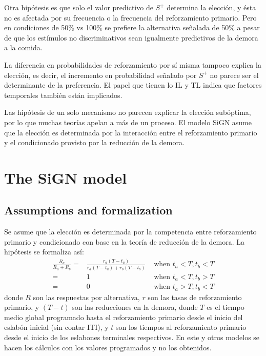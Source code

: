\documentclass[a4paper,12pt]{article}
\begin{document}
Otra hipótesis es que solo el valor predictivo de $S^{+}$ determina la elección, y ésta no es afectada por su frecuencia o la frecuencia del reforzamiento primario.
Pero en condiciones de 50\% vs 100\% se prefiere la alternativa señalada de 50\% a pesar de que los estímulos no discriminativos sean igualmente predictivos de la demora a la comida.

La diferencia en probabilidades de reforzamiento por sí misma tampoco explica la elección, es decir, el incremento en probabilidad señalado por $S^{+}$ no parece ser el determinante de la preferencia.
El papel que tienen lo IL y TL indica que factores temporales también están implicados.

Las hipótesis de un solo mecanismo no parecen explicar la elección subóptima, por lo que muchas teorías apelan a más de un proceso.
El modelo SiGN asume que la elección es determinada por la interacción entre el reforzamiento primario y el condicionado provisto por la reducción de la demora.

\section{The SiGN model}

\subsection{Assumptions and formalization}

Se asume que la elección es determinada por la competencia entre reforzamiento primario y condicionado con base en la teoría de reducción de la demora.
La hipótesis se formaliza así:
\[
\begin{array}{rlr}
    \frac{
        R_{a}
    }{
        R_{a} + R_{b}
    }=&
    \frac{
        r_{a}(T - t_{a})
    }{
        r_{a}(T - t_{a}) + r_{b}(T - t_{b})
    } &\mbox{ when }t_{a} < T, t_{b} < T\\
    =& 1 &\mbox{ when } t_{a} < T, t_{b} > T\\
    =& 0 & \mbox{ when } t_{a} > T, t_{b} < T
\end{array}
\]
donde $R$ son las respuestas por alternativa, $r$ son las tasas de reforzamiento primario, y $(T - t)$ son las reducciones en la demora, donde $T$ es el tiempo medio global programado hasta el reforzamiento primario desde el inicio del eslabón inicial (sin contar ITI), y $t$ son los tiempos al reforzamiento primario desde el inicio de los eslabones terminales respectivos.
En este y otros modelos se hacen los cálculos con los valores programados y no los obtenidos.
\end{document}
